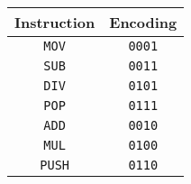 \begin{tabular}{cc}
    \toprule
    \textbf{Instruction} & \textbf{Encoding} \\
    \midrule
    \texttt{MOV}         & \texttt{0001}     \\
    \texttt{SUB}         & \texttt{0011}     \\
    \texttt{DIV}         & \texttt{0101}     \\
    \texttt{POP}         & \texttt{0111}     \\
    \texttt{ADD}         & \texttt{0010}     \\
    \texttt{MUL}         & \texttt{0100}     \\
    \texttt{PUSH}        & \texttt{0110}     \\
    \bottomrule
\end{tabular}
